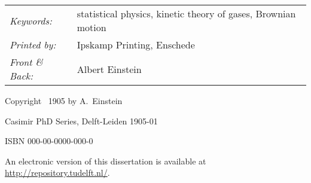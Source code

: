 \begin{titlepage}
\noindent
\begin{tabular}{@{}p{}@{}p{}}
    \textit{Keywords:} & statistical physics, kinetic theory of gases, Brownian motion
     \\[\medskipamount]
    \textit{Printed by:} & Ipskamp Printing, Enschede \\[\medskipamount]
    \textit{Front \& Back:} & Albert Einstein
\end{tabular}

\vspace{3\bigskipamount}

\noindent Copyright \textcopyright\ 1905 by A.~Einstein

\medskip
\noindent Casimir PhD Series, Delft-Leiden 1905-01

\medskip
\noindent ISBN 000-00-0000-000-0

\medskip
\noindent An electronic version of this dissertation is available at \\
\url{http://repository.tudelft.nl/}.

\end{titlepage}
